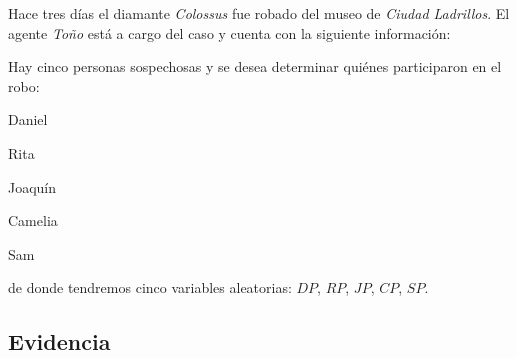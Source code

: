 Hace tres días el diamante \textit{Colossus} fue robado del museo de \textit{Ciudad Ladrillos}.  El agente \textit{Toño} está a cargo del caso y cuenta con la siguiente información:

Hay cinco personas sospechosas y se desea determinar quiénes participaron en el robo:
\begin{compactitem}
 \item Daniel
 \item Rita
 \item Joaquín
 \item Camelia
 \item Sam
\end{compactitem}
de donde tendremos cinco variables aleatorias: $DP$, $RP$, $JP$, $CP$, $SP$.

\subsection{Evidencia}

